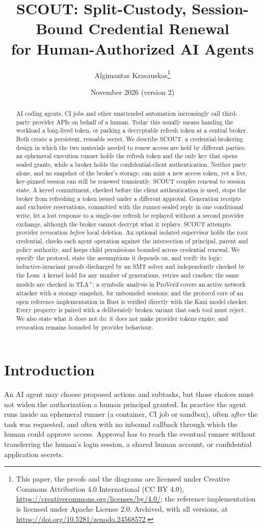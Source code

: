 \documentclass[11pt]{article}
\title{SCOUT: Split-Custody, Session-Bound Credential Renewal\\
for Human-Authorized AI Agents}
\author{Algimantas Krasauskas\thanks{This paper, the proofs and the diagrams are licensed under Creative Commons Attribution 4.0 International (CC BY 4.0), \url{https://creativecommons.org/licenses/by/4.0/}; the reference implementation is licensed under Apache License 2.0. Archived, with all versions, at \url{https://doi.org/10.5281/zenodo.24568572}.}}
\date{November 2026 (version 2)}
\begin{document}
\frenchspacing
\maketitle

\begin{abstract}
AI coding agents, CI jobs and other unattended automation increasingly call third-party provider APIs on behalf of a human. Today this usually means handing the workload a long-lived token, or parking a decryptable refresh token at a central broker. Both create a persistent, reusable secret. We describe SCOUT, a credential-brokering design in which the two materials needed to renew access are held by different parties: an ephemeral execution runner holds the refresh token and the only key that opens sealed grants, while a broker holds the confidential-client authentication. Neither party alone, and no snapshot of the broker's storage, can mint a new access token, yet a live, key-pinned session can still be renewed transiently. SCOUT couples renewal to session state. A keyed commitment, checked before the client authentication is used, stops the broker from refreshing a token issued under a different approval. Generation receipts and exclusive reservations, committed with the runner-sealed reply in one conditional write, let a lost response to a single-use refresh be replayed without a second provider exchange, although the broker cannot decrypt what it replays. SCOUT attempts provider revocation \emph{before} local deletion. An optional isolated supervisor holds the root credential, checks each agent operation against the intersection of principal, parent and policy authority, and keeps child permissions bounded across credential renewal. We specify the protocol, state the assumptions it depends on, and verify its logic: inductive-invariant proofs discharged by an SMT solver and independently checked by the Lean~4 kernel hold for any number of generations, retries and crashes; the same models are checked in TLA\textsuperscript{+}; a symbolic analysis in ProVerif covers an active network attacker with a storage snapshot, for unbounded sessions; and the protocol core of an open reference implementation in Rust is verified directly with the Kani model checker. Every property is paired with a deliberately broken variant that each tool must reject. We also state what it does not do: it does not make provider tokens expire, and revocation remains bounded by provider behaviour.
\end{abstract}

\section{Introduction}
An AI agent may choose proposed actions and subtasks, but those choices must not widen the authorization a human principal granted. In practice the agent runs inside an ephemeral runner (a container, CI job or sandbox), often \emph{after} the task was requested, and often with no inbound callback through which the human could approve access. Approval has to reach the eventual runner without transferring the human's login session, a shared human account, or confidential application secrets.
\end{document}
